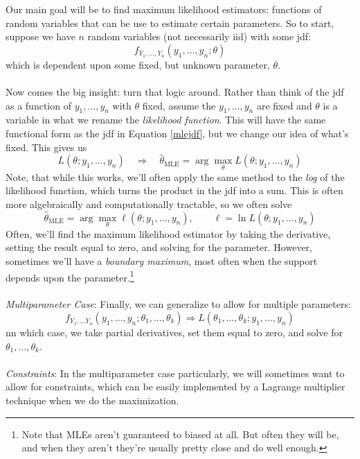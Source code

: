 \documentclass[a4paper,12pt]{scrartcl}
\begin{document}
Our main goal will be to find maximum likelihood estimators: functions
of random variables that can be use to estimate certain parameters.
So to start, suppose we have $n$ random variables (not necessarily
iid) with some jdf:
\begin{equation}
   \label{mlejdf}
    f_{Y_1, \ldots, Y_n}(y_1, \ldots, y_n; \theta) 
\end{equation}
which is dependent upon some fixed, but unknown parameter, $\theta$.
\\
\\
Now comes the big insight: turn that logic around. Rather than think
of the jdf as a function of $y_1, \ldots, y_n$ with $\theta$ fixed,
assume the $y_1, \ldots, y_n$ are fixed and $\theta$ is a variable
in what we rename the \emph{likelihood function}. 
This will have the same functional form as the jdf in Equation
\ref{mlejdf}, but we change our idea of what's fixed. This gives us
\begin{equation}
   \label{mlelik}
    L(\theta; y_1, \ldots, y_n) \quad\Rightarrow \quad
    \hat{\theta}_{\text{MLE}} =  
   \arg \max_\theta L(\theta; y_1, \ldots, y_n) 
\end{equation}
Note, that while this works, we'll often apply the same method to
the \emph{log} of the likelihood function, which turns the product
in the jdf into a sum. This is often more algebraically and 
computationally tractable, so we often solve
\[ \hat{\theta}_{\text{MLE}}  =
   \arg \max_\theta \ell(\theta; y_1, \ldots, y_n), 
   \qquad \ell = \ln L(\theta; y_1, \ldots, y_n)  \]
Often, we'll find the maximum likelihood estimator by taking the 
derivative, setting the result equal to zero, and solving for the
parameter. However, sometimes we'll have a \emph{boundary maximum},
most often when the support depends upon the parameter.\footnote{
Note that MLEs aren't guaranteed to biased at all. But often they will
be, and when they aren't they're usually pretty close and do
well enough.}
\\
\\
{\sl Multiparameter Case}: Finally, we can generalize to 
allow for multiple parameters:
   \[ f_{Y_1, \ldots Y_n}(y_1, \ldots, y_n; \theta_1, \ldots, \theta_k)
      \Rightarrow
      L(\theta_1, \ldots, \theta_k; y_1, \ldots, y_n )
      \]
nn which case, we take partial derivatives, set them equal to zero, 
and solve for $\theta_1, \ldots, \theta_k$.
\\
\\
{\sl Constraints}: In the multiparameter case particularly, we will
sometimes want to allow for constraints, which can be easily
implemented by a Lagrange multiplier technique when we do the
maximization.
\end{document}
